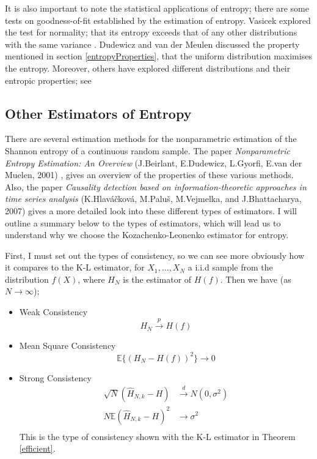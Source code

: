 \documentclass{report}
\begin{document}
It is also important to note the statistical applications of entropy; there are some tests on goodness-of-fit established by the estimation of entropy. Vasicek explored the test for normality; that its entropy exceeds that of any other distributions with the same variance \cite{stat1}. Dudewicz and van der Meulen \cite{stat2} discussed the property mentioned in section \ref{entropyProperties}, that the uniform distribution maximises the entropy. Moreover, others have explored different distributions and their entropic properties; see \cite{stat3, stat4}
 



\subsection{Other Estimators of Entropy} \label{otherestimators}

There are several estimation methods for the nonparametric estimation of the Shannon entropy of a continuous random sample. The paper \textit{Nonparametric Entropy Estimation: An Overview} (J.Beirlant, E.Dudewicz, L.Gyorfi, E.van der Muelen, 2001) \cite{paper10}, gives an overview of the properties of these various methods. Also, the paper \textit{Causality detection based on information-theoretic approaches in time series analysis} (K.Hlav\'{a}\v{c}kov\'{a}, M.Palu\v{s}, M.Vejmelka, and J.Bhattacharya, 2007) gives a more detailed look into these different types of estimators. I will outline a summary below to the types of estimators, which will lead us to understand why we choose the Kozachenko-Leonenko estimator for entropy. 

First, I must set out the types of consistency, so we can see more obviously how it compares to the K-L estimator, for $X_{1}, ..., X_{N}$ a i.i.d sample from the distribution $f(X)$, where $H_{N}$ is the estimator of $H(f)$. Then we have (as $N \to \infty$);
\begin{itemize}
\item Weak Consistency 
\begin{equation}
H_{N} \xrightarrow{p} H(f)
\end{equation}

\item Mean Square Consistency
\begin{equation}
\mathbb{E}\{(H_{N} - H(f))^2\} \to 0
\end{equation}

\item Strong Consistency
\begin{align}
\sqrt{N}(\hat{H}_{N, k} - H) &\xrightarrow{d} N(0, \sigma^2) \\
N \mathbb{E}{(\hat{H}_{N, k} - H)^2} &\xrightarrow{} \sigma^2 \\ \nonumber
\end{align}
This is the type of consistency shown with the K-L estimator in Theorem \ref{efficient}.

\end{itemize}
\end{document}
